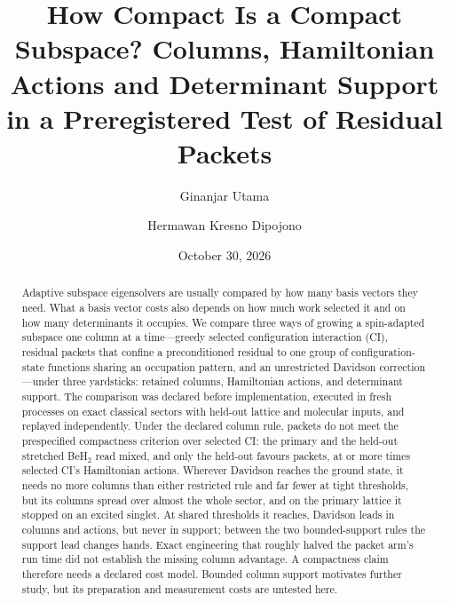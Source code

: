 \documentclass[aps,pra,reprint,superscriptaddress,nofootinbib,floatfix,
  showkeys,raggedbottom]{revtex4-2}
\begin{document}
\title{How Compact Is a Compact Subspace? Columns, Hamiltonian Actions and
Determinant Support in a Preregistered Test of Residual Packets}

\author{Ginanjar Utama}

\author{Hermawan Kresno Dipojono}

\date{October 30, 2026}

\begin{abstract}
Adaptive subspace eigensolvers are usually compared by how many basis vectors
they need. What a basis vector costs also depends on how much work selected it
and on how many determinants it occupies. We compare three ways of growing a
spin-adapted subspace one column at a time---greedy selected configuration
interaction (CI), residual packets that confine a preconditioned residual to
one group of configuration-state functions sharing an occupation pattern, and
an unrestricted Davidson correction---under three yardsticks: retained columns,
Hamiltonian actions, and determinant support. The comparison was declared
before implementation, executed in \pkCells{} fresh processes on
\pkInputCount{} exact classical sectors with held-out lattice and
molecular inputs, and replayed independently. Under the declared column rule,
packets do not meet the prespecified compactness criterion over selected CI:
the primary \pkPrimaryName{} and
the held-out stretched BeH$_2$ read mixed, and only the held-out
\pkChainName{} favours packets, at \pkChainMinActionRatio{} or more times
selected CI's Hamiltonian actions. Wherever Davidson reaches the ground state,
it needs no more columns than either restricted rule and far fewer at tight
thresholds, but its columns spread over almost the whole sector,
and on the primary lattice it stopped on an excited singlet. At shared
thresholds it reaches, Davidson leads in columns and actions, but never in
support; between the two bounded-support
rules the support lead changes hands. Exact engineering that roughly halved
the packet arm's run time did not establish the missing column advantage.
A compactness claim therefore needs a declared cost model. Bounded column
support motivates further study, but its preparation and measurement costs
are untested here.
\end{abstract}

\end{document}
